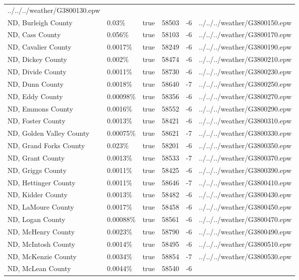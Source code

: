 \begin{longtable}[]{@{}llllll@{}}
../../../weather/G3800130.epw \\
ND, Burleigh County & 0.03\% & true & 58503 & -6 &
../../../weather/G3800150.epw \\
ND, Cass County & 0.056\% & true & 58103 & -6 &
../../../weather/G3800170.epw \\
ND, Cavalier County & 0.0017\% & true & 58249 & -6 &
../../../weather/G3800190.epw \\
ND, Dickey County & 0.002\% & true & 58474 & -6 &
../../../weather/G3800210.epw \\
ND, Divide County & 0.0011\% & true & 58730 & -6 &
../../../weather/G3800230.epw \\
ND, Dunn County & 0.0018\% & true & 58640 & -7 &
../../../weather/G3800250.epw \\
ND, Eddy County & 0.00098\% & true & 58356 & -6 &
../../../weather/G3800270.epw \\
ND, Emmons County & 0.0016\% & true & 58552 & -6 &
../../../weather/G3800290.epw \\
ND, Foster County & 0.0013\% & true & 58421 & -6 &
../../../weather/G3800310.epw \\
ND, Golden Valley County & 0.00075\% & true & 58621 & -7 &
../../../weather/G3800330.epw \\
ND, Grand Forks County & 0.023\% & true & 58201 & -6 &
../../../weather/G3800350.epw \\
ND, Grant County & 0.0013\% & true & 58533 & -7 &
../../../weather/G3800370.epw \\
ND, Griggs County & 0.0011\% & true & 58425 & -6 &
../../../weather/G3800390.epw \\
ND, Hettinger County & 0.0011\% & true & 58646 & -7 &
../../../weather/G3800410.epw \\
ND, Kidder County & 0.0013\% & true & 58482 & -6 &
../../../weather/G3800430.epw \\
ND, LaMoure County & 0.0017\% & true & 58458 & -6 &
../../../weather/G3800450.epw \\
ND, Logan County & 0.00088\% & true & 58561 & -6 &
../../../weather/G3800470.epw \\
ND, McHenry County & 0.0023\% & true & 58790 & -6 &
../../../weather/G3800490.epw \\
ND, McIntosh County & 0.0014\% & true & 58495 & -6 &
../../../weather/G3800510.epw \\
ND, McKenzie County & 0.0034\% & true & 58854 & -7 &
../../../weather/G3800530.epw \\
ND, McLean County & 0.0044\% & true & 58540 & -6 &

\end{longtable}
